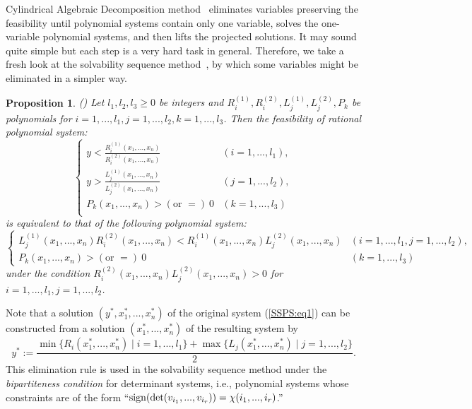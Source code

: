 \documentclass{article}
\newtheorem{prop}[thm]{\bfseries Proposition} %
\begin{document}
Cylindrical Algebraic Decomposition method~\cite{C75}
 eliminates variables preserving the feasibility until 
polynomial systems contain only one variable, 
solves the one-variable polynomial systems,
and then lifts the projected solutions.
It may sound quite simple but each step is a very hard task in general.
Therefore, we take a fresh look at the solvability sequence method~\cite{BS86},
by which some variables might be eliminated in a simpler way.
\begin{prop}\label{elimination1} {\rm (\cite{BS86})}
Let $l_{1},l_{2},l_3 \geq 0$ be integers and 
$R^{(1)}_i,R^{(2)}_i,L^{(1)}_j,L^{(2)}_j,P_k$ be polynomials for $i=1,...,l_1, j=1,...,l_2, k=1,...,l_3$.
Then the  feasibility of rational polynomial system:
\begin{equation} \label{SSPS:eq1}
\begin{cases}
y < \frac{R^{(1)}_{i}(x_{1},...,x_{n})}{R^{(2)}_{i}(x_{1},...,x_{n})} &  (i=1,...,l_{1}),\\
y > \frac{L^{(1)}_{j}(x_{1},...,x_{n})}{L^{(2)}_{j}(x_{1},...,x_{n})} &  (j=1,...,l_{2}),\\
P_k(x_1,...,x_n) >  (\text{or }=) \ 0 & (k=1,...,l_3)\\ 
\end{cases}
\end{equation}
is equivalent to that of the following polynomial system:
\begin{equation} \label{SSPS:eq2}
\begin{cases}
L^{(1)}_{j}(x_{1},...,x_{n})R^{(2)}_{i}(x_{1},...,x_{n}) < R^{(1)}_{i}(x_{1},...,x_{n})L^{(2)}_{j}(x_{1},...,x_{n}) & (i=1,...,l_{1},j=1,...,l_{2}), \\
P_k(x_1,...,x_n) >  (\text{or }=)  \ 0 & (k=1,...,l_3)
\end{cases}
\end{equation}
under the condition $R^{(2)}_{i}(x_{1},...,x_{n})L^{(2)}_{j}(x_{1},...,x_{n}) > 0$ for $i=1,...,l_{1},j=1,...,l_{2}$.
\end{prop}
Note that a solution $(y^{*},x_{1}^{*},...,x_{n}^{*})$ of the original system 
(\ref{SSPS:eq1})
can be constructed from a solution $(x_{1}^{*},...,x_{n}^{*})$ of the resulting system by 
\[y^{*}:= \frac{\min{\{ R_{i}(x_{1}^{*},...,x_{n}^{*}) \mid i=1,...,l_{1} \} } + \max{\{ L_{j}(x_{1}^{*},...,x_{n}^{*}) \mid j=1,...,l_{2} \} }}{2}.\]
This elimination rule is used in the solvability sequence method under the {\it bipartiteness condition} for determinant systems, i.e.,
polynomial systems whose constraints are of the form ``${\rm sign}(\det(v_{i_{1}},...,v_{i_{r}})) = \chi (i_{1},...,i_{r})$.''
\end{document}
